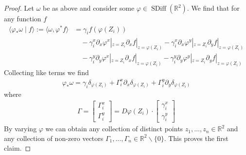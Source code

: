 \documentclass[12pt]{amsart}
\newcommand{\R}{\ensuremath{\mathbb{R}}}
\DeclareMathOperator{\SDiff}{SDiff}
\begin{document}
\begin{proof}
  Let $\omega$ be as above and consider some $\varphi \in \SDiff(\R^2)$.
  We find that for any function $f$
  \begin{align*}
    \langle \varphi_* \omega \mid f \rangle := \langle \omega , \varphi^* f\rangle
    &= \gamma_i f(\varphi(Z_i)) \\
    &\quad - \gamma_i^x \partial_x \varphi^x|_{z=Z_i} \partial_x f |_{z=\varphi(Z_i)}
    - \gamma_i^x \partial_x \varphi^y|_{z=Z_i} \partial_y f |_{z=\varphi(Z_i)} \\
    &\quad - \gamma_i^y \partial_y \varphi^x|_{z=Z_i} \partial_x f |_{z=\varphi(Z_i)}
    - \gamma_i^y \partial_y \varphi^y|_{z=Z_i} \partial_y f |_{z=\varphi(Z_i)}
  \end{align*}
  Collecting like terms we find
  \begin{align*}
    \varphi_* \omega = \gamma_i \delta_{\varphi(Z_i)} + \Gamma_i^x \partial_x \delta_{\varphi(Z_i)} + \Gamma_i^y \partial_y \delta_{\varphi(Z_i)}
  \end{align*}
  where
  \begin{align*}
    \Gamma = 
    \begin{bmatrix}
      \Gamma_i^x \\ \Gamma_i^y 
    \end{bmatrix}
    =
    D\varphi(Z_i) \cdot
    \begin{bmatrix}
      \gamma_i^x \\ \gamma_i^y
    \end{bmatrix}
  \end{align*}
  By varying $\varphi$ we can obtain 
  any collection of distinct points $z_1,\dots,z_n \in \R^2$
  and any collection of non-zero vectors $\Gamma_1,\dots,\Gamma_n \in \R^2 \backslash \{0\}$.
  This proves the first claim.


\end{proof}
\end{document}
